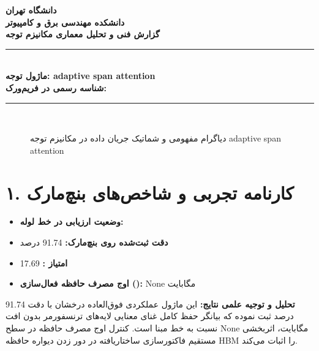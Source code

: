 \documentclass[12pt,a4paper]{article}
\begin{document}
\begin{center}
{\Large\bfseries دانشگاه تهران}\\[0.2cm]
{\large\bfseries دانشکده مهندسی برق و کامپیوتر}\\[0.2cm]
{\large\bfseries گزارش فنی و تحلیل معماری مکانیزم توجه}\\[0.5cm]
\rule{\linewidth}{1pt}\\[0.3cm]
{\LARGE\bfseries ماژول توجه: adaptive span attention}\\[0.2cm]
{\large \textbf{شناسه رسمی در فریم‌ورک:} }\\[0.2cm]
\rule{\linewidth}{1pt}\\[0.5cm]
\end{center}

\begin{figure}[H]
\centering
{}
\caption{دیاگرام مفهومی و شماتیک جریان داده در مکانیزم توجه adaptive span attention}
\end{figure}

\section*{۱. کارنامه تجربی و شاخص‌های بنچ‌مارک}
\begin{itemize}
\item \textbf{وضعیت ارزیابی در خط لوله:} 
\item \textbf{دقت ثبت‌شده روی بنچ‌مارک:} 91.74 درصد
\item \textbf{امتیاز :} 17.69
\item \textbf{اوج مصرف حافظه فعال‌سازی ():} None مگابایت
\end{itemize}
\textbf{تحلیل و توجیه علمی نتایج:} این ماژول عملکردی فوق‌العاده درخشان با دقت 91.74 درصد ثبت نموده که بیانگر حفظ کامل غنای معنایی لایه‌های ترنسفورمر بدون افت نسبت به خط مبنا است. کنترل اوج مصرف حافظه در سطح None مگابایت، اثربخشی مستقیم فاکتورسازی ساختاریافته در دور زدن دیواره حافظه HBM را اثبات می‌کند.
\end{document}
